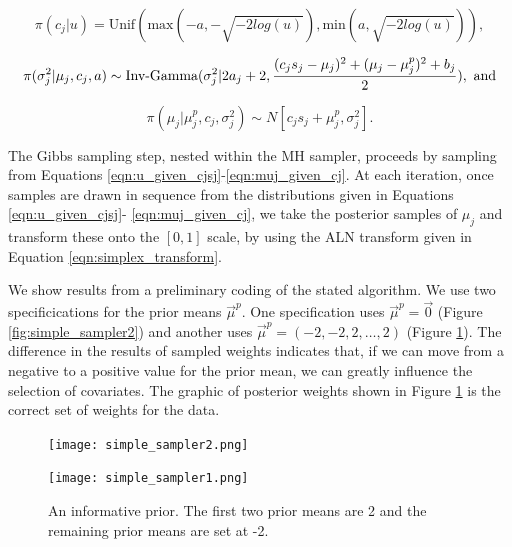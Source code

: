 \begin{equation}
\pi(c_j \vert u) = \text{Unif}(\text{max}(-a,-\sqrt{-2log(u)}), \text{min}(a,\sqrt{-2log(u)} )),
\end{equation}

\begin{equation}
\pi(\sigma^2_j \vert \mu_j, c_j, a) \sim \text{Inv-Gamma}({\sigma_j^2}\vert{2a_j+2},{\frac{(c_js_j-\mu_j)^2+ (\mu_j-\mu_j^p)^2+b_j}{2}}), \text{ and}
\end{equation}

\begin{equation}\label{eqn:muj_given_cj}
\pi(\mu_j\vert \mu_j^p, c_j, \sigma^2_j)\sim N[c_js_j+\mu_j^p, \sigma_j^2].
\end{equation}

 The Gibbs sampling step, nested within the MH sampler, proceeds by sampling from Equations \ref{eqn:u_given_cjsj}-\ref{eqn:muj_given_cj}.
At each iteration, once samples are drawn in sequence from the distributions given in Equations \ref{eqn:u_given_cjsj}- \ref{eqn:muj_given_cj}, we take the posterior samples of $\mu_j$ and transform these onto the $[0,1]$ scale, by using the ALN transform given in Equation \ref{eqn:simplex_transform}. 

We show results from a preliminary coding of the stated algorithm. We use two specificications for the prior means $\vec{\mu}^p$. One specification uses  $\vec{\mu}^p = \vec{0}$ (Figure \ref{fig:simple_sampler2}) and another uses $\vec{\mu}^p=(-2,-2,2,\dots,2)$ (Figure \ref{fig:simple_sampler1}). The difference in the results of sampled weights indicates that, if we can move from a negative to a positive value for the prior mean, we can greatly influence the selection of covariates. The graphic of posterior weights shown in Figure \ref{fig:simple_sampler1} is the correct set of weights for the data. 



 \begin{figure}[ht]
\begin{minipage}[b]{0.45\linewidth}
\centering
\texttt{[image: simple\_sampler2.png]}
\caption[Results for the zero mean prior]{A zero mean prior. Note that the two covariates that should have large probabilities are covariates 1 and 2.}
\label{fig:simple_sampler2}
\end{minipage}
\hspace{0.5cm}
\begin{minipage}[b]{0.45\linewidth}
\centering
\texttt{[image: simple\_sampler1.png]}
\caption[Results for the informative prior]{An informative prior. The first two prior means are 2 and the remaining prior means are set at -2.}
\label{fig:simple_sampler1}
\end{minipage}
\end{figure}


